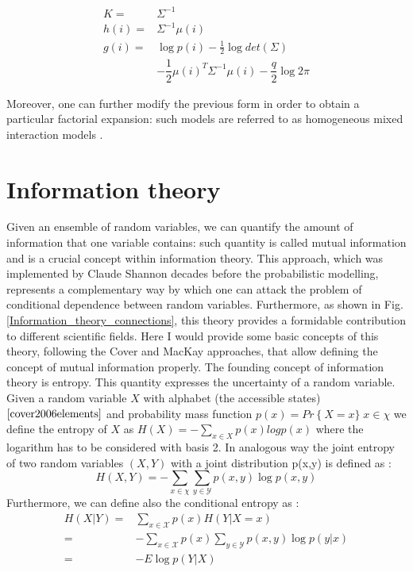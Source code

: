 \documentclass[12pt,%
               a4paper,%
               oneside,openany,%
               titlepage,%
               headinclude,footinclude,%
               BCOR5mm,%
               cleardoublepage=empty,%
               tablecaptionabove,%
               floatperchapter,
               ]{scrreprt}                 %
\begin{document}
\begin{equation}
\begin{split}
K=&\Sigma^{-1} \\
h(i)=&\Sigma^{-1}\mu(i) \\
g(i)=&\log p(i) -\frac{1}{2}\log det (\Sigma) \\
&-\dfrac{1}{2}\mu(i)^{T}\Sigma^{-1}\mu(i)-\dfrac{q}{2}\log 2\pi
\end{split}
\end{equation}

Moreover, one can further modify the previous form in order to obtain a particular factorial expansion: such models are referred to as homogeneous mixed interaction models \cite{hojsgaard2012graphical}.

\section{Information theory}
Given an ensemble of random variables, we can quantify the amount of information that one variable contains: such quantity is called mutual information and is a crucial concept within information theory. This approach, which was implemented by Claude Shannon decades before the probabilistic modelling, represents a complementary way by which one can attack the problem of conditional dependence between random variables. Furthermore, as shown in Fig. \ref{Information_theory_connections}, this theory provides a formidable contribution to different scientific fields. Here I would provide some basic concepts of this theory, following the Cover \cite{cover2006elements} and MacKay \cite{mackay2003information} approaches, that allow defining the concept of mutual information properly. The founding concept of information theory is entropy. This quantity expresses the uncertainty of a random variable. Given a random variable $X$ with alphabet (the accessible states) $\cite{cover2006elements}$ and probability mass function $p(x)=Pr\left\lbrace X=x \rbrace\; x \in \chi$ we define the entropy of $X$ as $H(X)=-\sum_{x \in X} p(x)log p(x)$ where the logarithm has to be considered with basis 2. In analogous way the joint entropy of two random variables $(X,Y)$ with a joint distribution p(x,y) is defined as \cite{cover2006elements}:
\begin{equation}
H(X,Y)=-\sum_{x\in \chi}\sum_{y\in \mathcal{Y}}p(x,y)\log p(x,y)
\end{equation}
Furthermore, we can define also the conditional entropy as \cite{cover2006elements}:
\begin{equation}
\begin{split}
H(X|Y)=& \sum_{x\in \mathcal{X} }p(x)H(Y|X=x)\\
=& -\sum_{x\in \mathcal{X}}p(x)\sum_{y\in \mathcal{Y}}p(x,y)\log p(y|x) \\
=& -E\log p(Y|X)
\end{split}
\end{equation}
\end{document}
